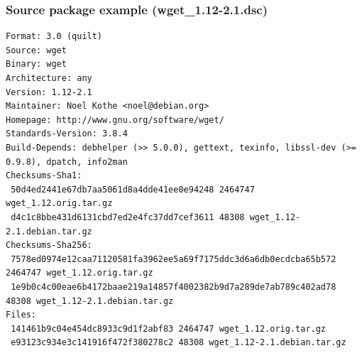 \documentclass[10pt,final,handout]{beamer}
\begin{document}
\begin{frame}[fragile]
	\frametitle{Source package example (wget\_1.12-2.1.dsc)}
\begin{lstlisting}[basicstyle=\ttfamily\footnotesize]
Format: 3.0 (quilt)
Source: wget
Binary: wget
Architecture: any
Version: 1.12-2.1
Maintainer: Noel Kothe <noel@debian.org>
Homepage: http://www.gnu.org/software/wget/
Standards-Version: 3.8.4
Build-Depends: debhelper (>> 5.0.0), gettext, texinfo, libssl-dev (>= 0.9.8), dpatch, info2man
Checksums-Sha1: 
 50d4ed2441e67db7aa5061d8a4dde41ee0e94248 2464747 wget_1.12.orig.tar.gz
 d4c1c8bbe431d6131cbd7ed2e4fc37dd7cef3611 48308 wget_1.12-2.1.debian.tar.gz
Checksums-Sha256: 
 7578ed0974e12caa71120581fa3962ee5a69f7175ddc3d6a6db0ecdcba65b572 2464747 wget_1.12.orig.tar.gz
 1e9b0c4c00eae6b4172baae219a14857f4002382b9d7a289de7ab789c402ad78 48308 wget_1.12-2.1.debian.tar.gz
Files: 
 141461b9c04e454dc8933c9d1f2abf83 2464747 wget_1.12.orig.tar.gz
 e93123c934e3c141916f472f380278c2 48308 wget_1.12-2.1.debian.tar.gz
\end{lstlisting}
\end{frame}
\end{document}
